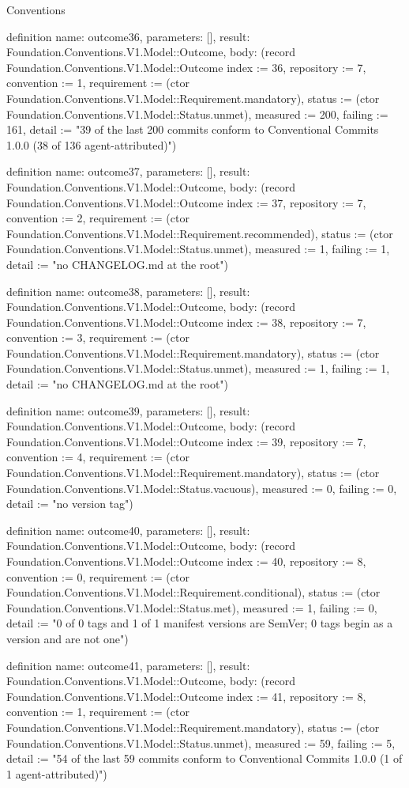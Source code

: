 \begin{lexlean}{Conventions}
\begin{semanticmodule}
definition{
  name: outcome36,
  parameters: [],
  result: Foundation.Conventions.V1.Model::Outcome,
  body: (record Foundation.Conventions.V1.Model::Outcome {index := 36, repository := 7, convention := 1, requirement := (ctor Foundation.Conventions.V1.Model::Requirement.mandatory), status := (ctor Foundation.Conventions.V1.Model::Status.unmet), measured := 200, failing := 161, detail := "39 of the last 200 commits conform to Conventional Commits 1.0.0 (38 of 136 agent-attributed)"})
}

definition{
  name: outcome37,
  parameters: [],
  result: Foundation.Conventions.V1.Model::Outcome,
  body: (record Foundation.Conventions.V1.Model::Outcome {index := 37, repository := 7, convention := 2, requirement := (ctor Foundation.Conventions.V1.Model::Requirement.recommended), status := (ctor Foundation.Conventions.V1.Model::Status.unmet), measured := 1, failing := 1, detail := "no CHANGELOG.md at the root"})
}

definition{
  name: outcome38,
  parameters: [],
  result: Foundation.Conventions.V1.Model::Outcome,
  body: (record Foundation.Conventions.V1.Model::Outcome {index := 38, repository := 7, convention := 3, requirement := (ctor Foundation.Conventions.V1.Model::Requirement.mandatory), status := (ctor Foundation.Conventions.V1.Model::Status.unmet), measured := 1, failing := 1, detail := "no CHANGELOG.md at the root"})
}

definition{
  name: outcome39,
  parameters: [],
  result: Foundation.Conventions.V1.Model::Outcome,
  body: (record Foundation.Conventions.V1.Model::Outcome {index := 39, repository := 7, convention := 4, requirement := (ctor Foundation.Conventions.V1.Model::Requirement.mandatory), status := (ctor Foundation.Conventions.V1.Model::Status.vacuous), measured := 0, failing := 0, detail := "no version tag"})
}

definition{
  name: outcome40,
  parameters: [],
  result: Foundation.Conventions.V1.Model::Outcome,
  body: (record Foundation.Conventions.V1.Model::Outcome {index := 40, repository := 8, convention := 0, requirement := (ctor Foundation.Conventions.V1.Model::Requirement.conditional), status := (ctor Foundation.Conventions.V1.Model::Status.met), measured := 1, failing := 0, detail := "0 of 0 tags and 1 of 1 manifest versions are SemVer; 0 tags begin as a version and are not one"})
}

definition{
  name: outcome41,
  parameters: [],
  result: Foundation.Conventions.V1.Model::Outcome,
  body: (record Foundation.Conventions.V1.Model::Outcome {index := 41, repository := 8, convention := 1, requirement := (ctor Foundation.Conventions.V1.Model::Requirement.mandatory), status := (ctor Foundation.Conventions.V1.Model::Status.unmet), measured := 59, failing := 5, detail := "54 of the last 59 commits conform to Conventional Commits 1.0.0 (1 of 1 agent-attributed)"})
}


\end{semanticmodule}
\end{lexlean}
